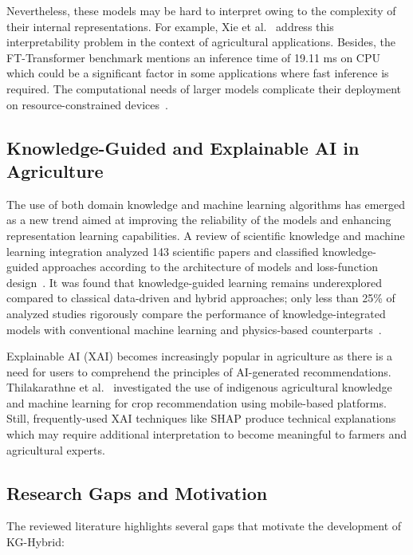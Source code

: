 \documentclass[journal]{IEEEtran}
\begin{document}
Nevertheless, these models may be hard to interpret owing to the complexity of their internal representations. For example, Xie et al.~\cite{xie2024recent} address this interpretability problem in the context of agricultural applications. Besides, the FT-Transformer benchmark mentions an inference time of 19.11 ms on CPU~\cite{fttransformer2026benchmarking} which could be a significant factor in some applications where fast inference is required. The computational needs of larger models complicate their deployment on resource-constrained devices~\cite{phull2025advances}.

\subsection{Knowledge-Guided and Explainable AI in Agriculture}

The use of both domain knowledge and machine learning algorithms has emerged as a new trend aimed at improving the reliability of the models and enhancing representation learning capabilities. A review of scientific knowledge and machine learning integration analyzed 143 scientific papers and classified knowledge-guided approaches according to the architecture of models and loss-function design~\cite{beyond2026data}. It was found that knowledge-guided learning remains underexplored compared to classical data-driven and hybrid approaches; only less than 25\% of analyzed studies rigorously compare the performance of knowledge-integrated models with conventional machine learning and physics-based counterparts~\cite{beyond2026data}.

Explainable AI (XAI) becomes increasingly popular in agriculture as there is a need for users to comprehend the principles of AI-generated recommendations. Thilakarathne et al.~\cite{thilakarathne2025machine} investigated the use of indigenous agricultural knowledge and machine learning for crop recommendation using mobile-based platforms. Still, frequently-used XAI techniques like SHAP produce technical explanations which may require additional interpretation to become meaningful to farmers and agricultural experts.

\subsection{Research Gaps and Motivation}

The reviewed literature highlights several gaps that motivate the development of KG-Hybrid:
\end{document}
